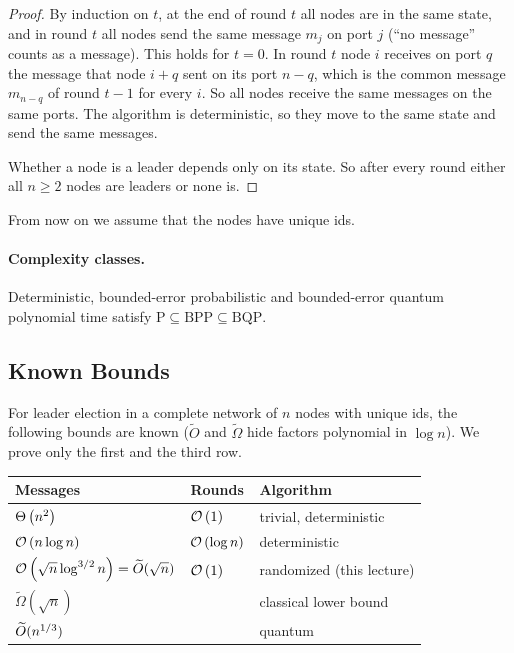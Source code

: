 \begin{exercisebox}
\begin{proof}
    By induction on $t$, at the end of round $t$ all nodes are in the same state, and in round $t$
    all nodes send the same message $m_j$ on port $j$ (``no message'' counts as a message). This
    holds for $t = 0$. In round $t$ node $i$ receives on port $q$ the message that node $i + q$ sent
    on its port $n - q$, which is the common message $m_{n-q}$ of round $t - 1$ for every $i$. So
    all nodes receive the same messages on the same ports. The algorithm is deterministic, so they
    move to the same state and send the same messages.

    Whether a node is a leader depends only on its state. So after every round either all
    $n \geq 2$ nodes are leaders or none is.
\end{proof}
\end{exercisebox}

From now on we assume that the nodes have unique ids.

\paragraph{Complexity classes.} Deterministic, bounded-error probabilistic and bounded-error quantum
polynomial time satisfy $\mathrm{P} \subseteq \mathrm{BPP} \subseteq \mathrm{BQP}$.

\subsection{Known Bounds}

For leader election in a complete network of $n$ nodes with unique ids, the following bounds are
known ($\widetilde{O}$ and $\widetilde{\Omega}$ hide factors polynomial in $\log n$). We prove only
the first and the third row.
\begin{center}
    \begin{tabular}{lll}
        Messages                                           & Rounds            & Algorithm                \\
        \hline
        $\Theta\left(n^2\right)$                                      & $\mathcal{O}\left(1\right)$        & trivial, deterministic   \\
        $\mathcal{O}\left(n \log n\right)$                                  & $\mathcal{O}\left(\log n\right)$   & deterministic            \\
        $\mathcal{O}\left(\sqrt{n} \log^{3/2} n\right) = \widetilde{O}(\sqrt{n})$ & $\mathcal{O}\left(1\right)$ & randomized (this lecture) \\
        $\widetilde{\Omega}(\sqrt{n})$                     &                   & classical lower bound    \\
        $\widetilde{O}(n^{1/3})$                  &                   & quantum                  \\
    \end{tabular}
\end{center}

